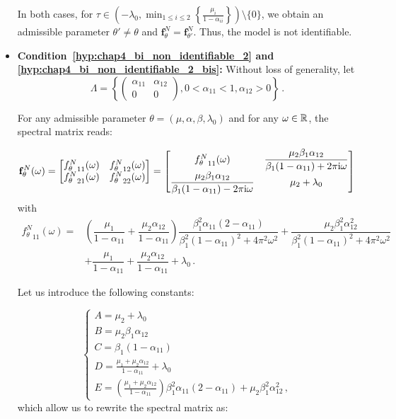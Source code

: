 \begin{subappendices}
\begin{itemize}
In both cases, for $\tau \in\left(-\lambda_0, \min_{1\leq i \leq 2}\left\{\frac{\mu_i}{1-\alpha_{ii}}\right\} \right)\setminus\{0\}$, we obtain an admissible parameter $\theta' \neq \theta$ and
$\mathbf{f}_\theta^N = \mathbf{f}_{\theta'}^N$.
Thus, the model is not identifiable.






\item \textbf{Condition~\ref{hyp:chap4_bi_non_identifiable_2} and \ref{hyp:chap4_bi_non_identifiable_2_bis}:} 
Without loss of generality, let 
\[\Lambda = \left\{ \begin{pmatrix} \alpha_{11} & \alpha_{12} \\ 0 & 0 \end{pmatrix}, 0 < \alpha_{11} < 1, \alpha_{12} > 0 \right\}\,.\] 

For any admissible parameter $\theta = (\mu, \alpha, \beta, \lambda_0)$ and for any $\omega\in{\mathbb R}$, the spectral matrix reads: 

\begin{equation*}
\mathbf{f}_\theta^N(\omega) = 
\begin{bmatrix}
  {f_\theta^N}_{11}(\omega) & {f_\theta^N}_{12}(\omega)\\
  {f_\theta^N}_{21}(\omega) & {f_\theta^N}_{22}(\omega)
\end{bmatrix}	=
\begin{bmatrix}
  {f_\theta^N}_{11}(\omega) &  \dfrac{\mu_2 \beta_1 \alpha_{12}}{\beta_1(1-\alpha_{11}) + 2 \pi \mathrm{i} \omega}\\
   \dfrac{\mu_2 \beta_1 \alpha_{12}}{\beta_1(1-\alpha_{11}) - 2 \pi \mathrm{i} \omega} & \mu_2 + \lambda_0
\end{bmatrix}
\end{equation*}
with 
\begin{align*}
{f_\theta^N}_{11}(\omega) = &\left(\dfrac{\mu_1}{1-\alpha_{11}} + \dfrac{\mu_2\alpha_{12}}{1-\alpha_{11}} \right)\dfrac{\beta_1^2 \alpha_{11}(2-\alpha_{11})}{\beta_1^2 (1-\alpha_{11})^2 + 4 \pi^2\omega^2} + \dfrac{\mu_2 \beta_1^2 \alpha_{12}^2}{\beta_1^2 (1-\alpha_{11})^2 + 4 \pi^2\omega^2} \\
&+ \dfrac{\mu_1}{1-\alpha_{11}} + \dfrac{\mu_2\alpha_{12}}{1-\alpha_{11}} + \lambda_0\,.
\end{align*}

Let us introduce the following constants:

\begin{equation*}
\begin{cases}
  A = \mu_2 + \lambda_0\\
  B = \mu_2 \beta_1 \alpha_{12}\\
  C = \beta_1 (1-\alpha_{11})\\
  D = \frac{\mu_1 + \mu_2 \alpha_{12}}{1-\alpha_{11}} + \lambda_0\\
  E = (\frac{\mu_1 + \mu_2 \alpha_{12}}{1-\alpha_{11}} ) \beta_1^2 \alpha_{11} (2-\alpha_{11}) + \mu_2 \beta_1^2 \alpha_{12}^2\,,
\end{cases}
\end{equation*}
which allow us to rewrite the spectral matrix as:


\end{itemize}
\end{subappendices}
